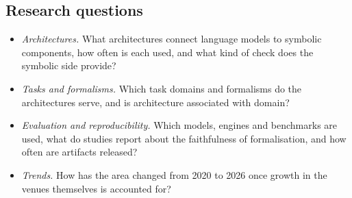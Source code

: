 \subsection{Research questions}
\begin{itemize}
  \item[\RQ{1}] \emph{Architectures.} What architectures connect language models to symbolic components, how often is each used, and what kind of check does the symbolic side provide?
  \item[\RQ{2}] \emph{Tasks and formalisms.} Which task domains and formalisms do the architectures serve, and is architecture associated with domain?
  \item[\RQ{3}] \emph{Evaluation and reproducibility.} Which models, engines and benchmarks are used, what do studies report about the faithfulness of formalisation, and how often are artifacts released?
  \item[\RQ{4}] \emph{Trends.} How has the area changed from 2020 to 2026 once growth in the venues themselves is accounted for?
\end{itemize}

